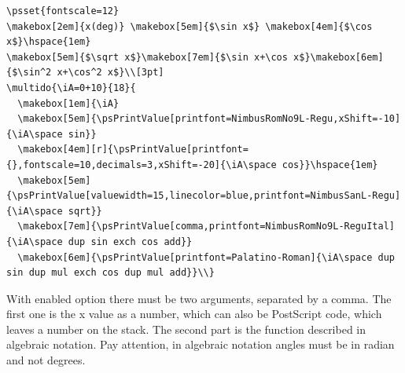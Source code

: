 \documentclass[fontsize=11pt,english,BCOR=10mm,DIV=12,bibliography=totoc,parskip=false,headings=small,
    headinclude=false,footinclude=false,oneside]{pst-doc}
\begin{document}
\bigskip

\begin{lstlisting}
\psset{fontscale=12}
\makebox[2em]{x(deg)} \makebox[5em]{$\sin x$} \makebox[4em]{$\cos x$}\hspace{1em}
\makebox[5em]{$\sqrt x$}\makebox[7em]{$\sin x+\cos x$}\makebox[6em]{$\sin^2 x+\cos^2 x$}\\[3pt]
\multido{\iA=0+10}{18}{
  \makebox[1em]{\iA}
  \makebox[5em]{\psPrintValue[printfont=NimbusRomNo9L-Regu,xShift=-10]{\iA\space sin}}
  \makebox[4em][r]{\psPrintValue[printfont={},fontscale=10,decimals=3,xShift=-20]{\iA\space cos}}\hspace{1em}
  \makebox[5em]{\psPrintValue[valuewidth=15,linecolor=blue,printfont=NimbusSanL-Regu]{\iA\space sqrt}}
  \makebox[7em]{\psPrintValue[comma,printfont=NimbusRomNo9L-ReguItal]{\iA\space dup sin exch cos add}}
  \makebox[6em]{\psPrintValue[printfont=Palatino-Roman]{\iA\space dup sin dup mul exch cos dup mul add}}\\}
\end{lstlisting}




With enabled  option there must be two arguments, separated by a comma.
The first one is the x value as a number, which can also be PostScript code, which leaves a
number on the stack. The second part is the function described in algebraic notation.
Pay attention, in algebraic notation angles must be in radian and not degrees.


\clearpage


\begin{center}
  \hspace{1em}
\\[3pt]
\end{center}
\end{document}
